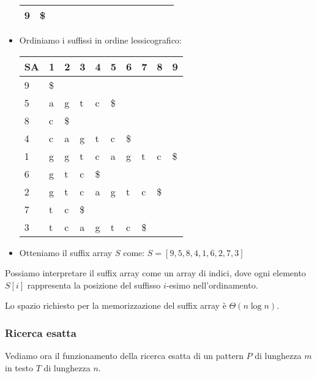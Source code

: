 \begin{esempio}
\begin{itemize}
\begin{table}[!ht]
\begin{tabular}{|l|l|l|l|l|l|l|l|l|l|}
                      9  & \$ & ~  & ~  & ~  & ~  & ~  & ~  & ~  & ~  \\ \hline
                  \end{tabular}
              \end{table}
        \item Ordiniamo i suffissi in ordine lessicografico:
              \begin{table}[!ht]
                  \centering
                  \begin{tabular}{|l|l|l|l|l|l|l|l|l|l|}
                      \hline
                      SA & 1  & 2  & 3  & 4  & 5  & 6  & 7  & 8  & 9  \\ \hline
                      9  & \$ & ~  & ~  & ~  & ~  & ~  & ~  & ~  & ~  \\ \hline
                      5  & a  & g  & t  & c  & \$ & ~  & ~  & ~  & ~  \\ \hline
                      8  & c  & \$ & ~  & ~  & ~  & ~  & ~  & ~  & ~  \\ \hline
                      4  & c  & a  & g  & t  & c  & \$ & ~  & ~  & ~  \\ \hline
                      1  & g  & g  & t  & c  & a  & g  & t  & c  & \$ \\ \hline
                      6  & g  & t  & c  & \$ & ~  & ~  & ~  & ~  & ~  \\ \hline
                      2  & g  & t  & c  & a  & g  & t  & c  & \$ & ~  \\ \hline
                      7  & t  & c  & \$ & ~  & ~  & ~  & ~  & ~  & ~  \\ \hline
                      3  & t  & c  & a  & g  & t  & c  & \$ & ~  & ~  \\ \hline
                  \end{tabular}
              \end{table}
        \item Otteniamo il suffix array $S$ come: $S = [9, 5, 8, 4, 1, 6, 2, 7, 3]$
    \end{itemize}
\end{esempio}
Possiamo interpretare il suffix array come un array di indici, dove ogni elemento
$S[i]$ rappresenta la posizione del suffisso $i$-esimo nell'ordinamento.

Lo spazio richiesto per la memorizzazione del suffix array è $\Theta(n \log n)$.
\subsubsection{Ricerca esatta}
Vediamo ora il funzionamento della ricerca esatta di un pattern $P$ di lunghezza
$m$ in testo $T$ di lunghezza $n$.

